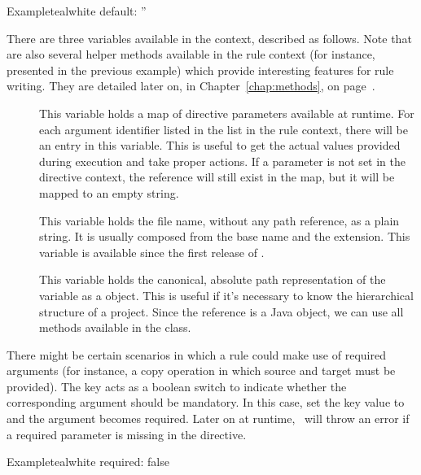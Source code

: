 \begin{description}
\begin{description}
\begin{codebox}{Example}{teal}{\icnote}{white}
default: ''
\end{codebox}

There are three variables available in the  context, described as follows. Note that are also several helper methods available in the rule context (for instance,  presented in the previous example) which provide interesting features for rule writing. They are detailed later on, in Chapter~\ref{chap:methods}, on page~\pageref{chap:methods}.

\begin{description}
\item[] This variable holds a map of directive parameters available at runtime. For each argument identifier listed in the  list in the rule context, there will be an entry in this variable. This is useful to get the actual values provided during execution and take proper actions. If a parameter is not set in the directive context, the reference will still exist in the map, but it will be mapped to an empty string.

\item[] This variable holds the file name, without any path reference, as a plain string. It is usually composed from the base name and the extension. This variable is available since the first release of \arara.

\item[] This variable holds the canonical, absolute path representation of the  variable as a  object. This is useful if it's necessary to know the hierarchical structure of a project. Since the reference is a Java object, we can use all methods available in the  class.
\end{description}

\item[\describecontext{O}{arguments}{required}] There might be certain scenarios in which a rule could make use of required arguments (for instance, a copy operation in which source and target must be provided). The  key acts as a boolean switch to indicate whether the corresponding argument should be mandatory. In this case, set the key value to  and the argument becomes required. Later on at runtime, \arara\ will throw an error if a required parameter is missing in the directive.

\begin{codebox}{Example}{teal}{\icnote}{white}
required: false
\end{codebox}


\end{description}
\end{description}
